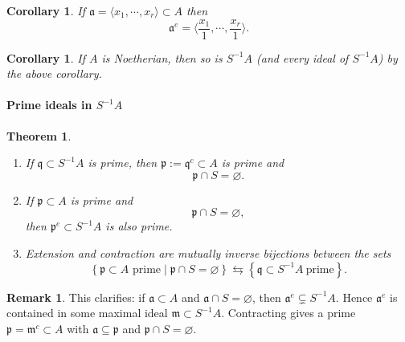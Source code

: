\documentclass[11pt,a4paper]{article}
\theoremstyle{definition}
\newtheorem{remark}[definition]{Remark}
\theoremstyle{plain}
\newtheorem{theorem}[definition]{Theorem}
\newtheorem{corollary}[definition]{Corollary}
\theoremstyle{remark}
\renewcommand{\set}[1]{\left\{ #1 \right\}}
\newcommand{\angles}[1]{\langle #1 \rangle}
\begin{document}
\begin{corollary}
    If $\mathfrak{a} = \angles{x_1, \cdots, x_r} \subset A$ then 
    $$\mathfrak{a}^e = \angles{\frac{x_1}{1}, \cdots, \frac{x_r}{1}}.$$
\end{corollary}

\begin{corollary}
    If $A$ is Noetherian, then so is $S^{-1} A$ (and every ideal of $S^{-1}A$) by the above corollary.
\end{corollary}

\paragraph{Prime ideals in $S^{-1}A$}
\begin{theorem}
    \begin{enumerate}
        \item 
        If $\mathfrak{q} \subset S^{-1}A$ is prime, then 
        $\mathfrak{p} := \mathfrak{q}^c \subset A$ is prime and 
        $$\mathfrak{p} \cap S = \varnothing.$$

        \item If $\mathfrak{p} \subset A$ is prime and 
        $$\mathfrak{p} \cap S = \varnothing,$$
        then $\mathfrak{p}^e \subset S^{-1}A$ is also prime. 

        \item Extension and contraction are mutually inverse bijections between the sets 
        $$\set{\mathfrak{p} \subset A \text{ prime} \mid \mathfrak{p} \cap S = \varnothing} \leftrightarrows \set{\mathfrak{q} \subset S^{-1}A \ \text{prime}}.$$
    \end{enumerate}
\end{theorem}

\begin{remark}
    This clarifies: if $\mathfrak{a} \subset A$ and $\mathfrak{a} \cap S = \varnothing$, then $\mathfrak{a}^e \subsetneq S^{-1}A$.
    Hence $\mathfrak{a}^e$ is contained in some maximal ideal $\mathfrak{m}\subset S^{-1}A$.
    Contracting gives a prime $\mathfrak{p}=\mathfrak{m}^c\subset A$ with $\mathfrak{a}\subseteq \mathfrak{p}$ and $\mathfrak{p}\cap S=\varnothing$.
\end{remark}
\end{document}
